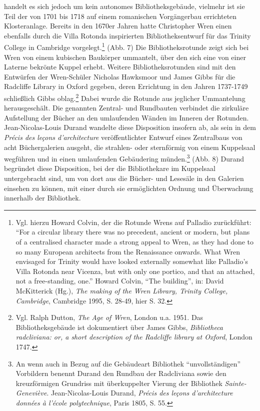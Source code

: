 handelt es sich jedoch um kein autonomes Bibliotheksgebäude, vielmehr
ist sie Teil der von 1701 bis 1718 auf einem romanischen Vorgängerbau
errichteten Klosteranlage. Bereits in den 1670er Jahren hatte
Christopher Wren einen ebenfalls durch die Villa Rotonda inspirierten
Bibliotheksentwurf für das Trinity College in Cambridge
vorgelegt.\footnote{Vgl. hierzu Howard Colvin, der die Rotunde Wrens auf
  Palladio zurückführt: \enquote{For a circular library there was no
  precedent, ancient or modern, but plans of a centralised character
  made a strong appeal to Wren, as they had done to so many European
  architects from the Renaissance onwards. What Wren envisaged for
  Trinity would have looked externally somewhat like Palladio's Villa
  Rotonda near Vicenza, but with only one portico, and that an attached,
  not a free-standing, one.} Howard Colvin, \enquote{The building}, in:
  David McKitterick (Hg.), \emph{The making of the Wren Library, Trinity
  College, Cambridge}, Cambridge 1995, S. 28-49, hier S. 32.} (Abb. 7)
Die Bibliotheksrotunde zeigt sich bei Wren von einem kubischen Baukörper
ummantelt, über den sich eine von einer Laterne bekrönte Kuppel erhebt.
Weitere Bibliotheksrotunden sind mit den Entwürfen der Wren-Schüler
Nicholas Hawksmoor und James Gibbs für die Radcliffe Library in Oxford
gegeben, deren Errichtung in den Jahren 1737-1749 schließlich Gibbs
oblag.\footnote{Vgl. Ralph Dutton, \emph{The Age of Wren}, London u.a.
  1951. Das Bibliotheksgebäude ist dokumentiert über James Gibbs,
  \emph{Bibliotheca radcliviana: or, a short description of the
  Radcliffe library at Oxford}, London 1747.} Dabei wurde die Rotunde
aus jeglicher Ummantelung herausgeschält. Die genannten Zentral- und
Rundbauten verbindet die zirkuläre Aufstellung der Bücher an den
umlaufenden Wänden im Inneren der Rotunden. Jean-Nicolas-Louis Durand
wandelte diese Disposition insofern ab, als sein in dem \emph{Précis des
leçons d'architecture} veröffentlichter Entwurf eines Zentralbaus von
acht Büchergalerien ausgeht, die strahlen- oder sternförmig von einem
Kuppelsaal wegführen und in einen umlaufenden Gebäudering
münden.\footnote{An wenn auch in Bezug auf die Gebäudeart Bibliothek
  \enquote{unvollständigen} Vorbildern benennt Durand den Rundbau der
  Radcliviana sowie den kreuzförmigen Grundriss mit überkuppelter
  Vierung der Bibliothek \emph{Sainte-Geneviève}. Jean-Nicolas-Louis
  Durand, \emph{Précis des leçons d'architecture données à l'école
  polytechnique}, Paris 1805, S. 55.} (Abb. 8) Durand begründet diese
Disposition, bei der die Bibliothekare im Kuppelsaal untergebracht sind,
um von dort aus die Bücher- und Lesesäle in den Galerien einsehen zu
können, mit einer durch sie ermöglichten Ordnung und Überwachung
innerhalb der Bibliothek.

